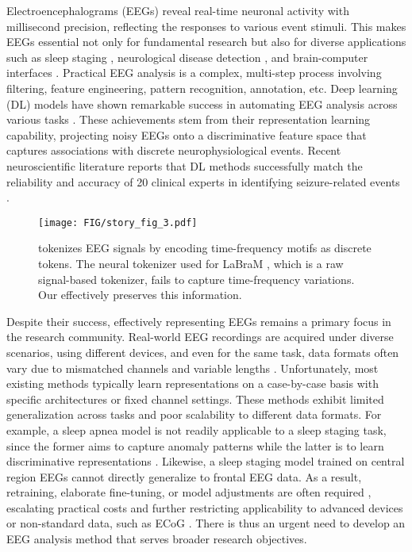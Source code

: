 Electroencephalograms (EEGs) reveal real-time neuronal activity with millisecond precision, reflecting the responses to various event stimuli. 
This makes EEGs essential not only for fundamental research \cite{OxfordBrain2019,NatNeuroscience2021} but also for diverse applications such as sleep staging \cite{phan2022sleeptransformer,yang2021self,pradeepkumar2024towards}, neurological disease detection \cite{kotoge2024splitsee,afzal2024ICMLrest}, and brain-computer interfaces \cite{ICML2012Precup_850,Lukas2022ICML,NEURIPS2023_AMAG}.
Practical EEG analysis is a complex, multi-step process involving filtering, feature engineering, pattern recognition, annotation, etc.
Deep learning (DL) models have shown remarkable success in automating EEG analysis across various tasks \cite{sharma2022evolutionary,GNN_ICLR22,Chen2023TNSRE}.
These achievements stem from their representation learning capability, projecting noisy EEGs onto a discriminative feature space that captures associations with discrete neurophysiological events.
Recent neuroscientific literature reports that DL methods successfully match the reliability and accuracy of 20 clinical experts in identifying seizure-related events \cite{jing2023development}.

 
\begin{figure}[t]
    \centering
    \texttt{[image: FIG/story\_fig\_3.pdf]}
    \caption{\tokenizer tokenizes EEG signals by encoding time-frequency motifs as discrete tokens. The neural tokenizer used for LaBraM \cite{jiang2024large}, which is a raw signal-based tokenizer, fails to capture time-frequency variations. Our \tokenizer effectively preserves this information.}
    \label{fig:story_fig}
\end{figure}

Despite their success, effectively representing EEGs remains a primary focus in the research community.
Real-world EEG recordings are acquired under diverse scenarios, using different devices, and even for the same task, data formats often vary due to mismatched channels and variable lengths  \cite{yang2024biot}. 
Unfortunately, most existing methods typically learn representations on a case-by-case basis with specific architectures or fixed channel settings.
These methods exhibit limited generalization across tasks and poor scalability to different data formats.
For example, a sleep apnea model is not readily applicable to a sleep staging task, since the former aims to capture anomaly patterns while the latter is to learn discriminative representations \cite{pradeepkumar2024towards}.
Likewise, a sleep staging model trained on central region EEGs cannot directly generalize to frontal EEG data.
As a result, retraining, elaborate fine-tuning, or model adjustments are often required \cite{yang2024biot}, escalating practical costs and further restricting applicability to advanced devices or non-standard data, such as ECoG \cite{pradeepkumar2021decoding}.
There is thus an urgent need to develop an EEG analysis method that serves broader research objectives.

